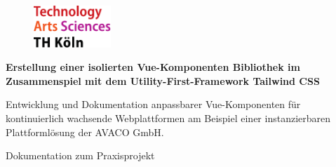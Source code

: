 \begin{titlepage}

\begin{center}

\begin{figure}[!ht]
		\includegraphics[width=0.26\textwidth]{images/THlogoheader.pdf}
\end{figure}

\vspace{1.5cm}

\begin{rmfamily}
\begin{huge}
\textbf{ Erstellung einer isolierten Vue-Komponenten Bibliothek im Zusammenspiel mit dem Utility-First-Framework Tailwind CSS}\\	
\end{huge}
\vspace{0.5cm}
\begin{LARGE}
	Entwicklung und Dokumentation anpassbarer Vue-Komponenten für kontinuierlich wachsende Webplattformen am Beispiel einer instanzierbaren Plattformlösung der AVACO GmbH. \\
\end{LARGE}
\end{rmfamily}

\vspace{0.8cm}



\begin{LARGE}
\begin{scshape}
Dokumentation zum Praxisprojekt\\[0.8em]
\end{scshape}
\end{LARGE}


\end{center}
\end{titlepage}
